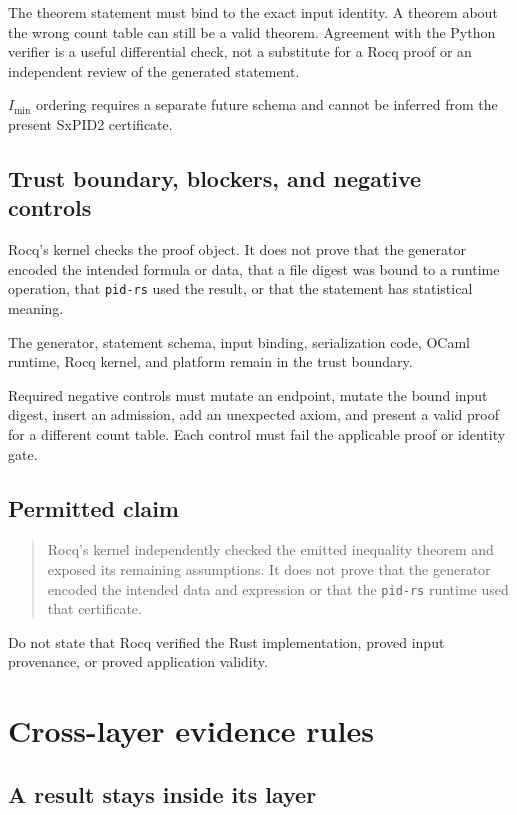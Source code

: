 \documentclass[11pt]{article}
\begin{document}
The theorem statement must bind to the exact input identity.  A theorem about the wrong count
table can still be a valid theorem.  Agreement with the Python verifier is a useful differential
check, not a substitute for a Rocq proof or an independent review of the generated statement.

\(I_{\min}\) ordering requires a separate future schema and cannot be inferred from the present
SxPID2 certificate.

\subsection{Trust boundary, blockers, and negative controls}

Rocq's kernel checks the proof object.  It does not prove that the generator encoded the intended
formula or data, that a file digest was bound to a runtime operation, that \texttt{pid-rs} used the
result, or that the statement has statistical meaning.

The generator, statement schema, input binding, serialization code, OCaml runtime, Rocq kernel,
and platform remain in the trust boundary.

Required negative controls must mutate an endpoint, mutate the bound input digest, insert an
admission, add an unexpected axiom, and present a valid proof for a different count table.  Each
control must fail the applicable proof or identity gate.

\subsection{Permitted claim}

\begin{quote}
Rocq's kernel independently checked the emitted inequality theorem and exposed its remaining
assumptions.  It does not prove that the generator encoded the intended data and expression or
that the \texttt{pid-rs} runtime used that certificate.
\end{quote}

Do not state that Rocq verified the Rust implementation, proved input provenance, or proved
application validity.

\section{Cross-layer evidence rules}

\subsection{A result stays inside its layer}
\end{document}
